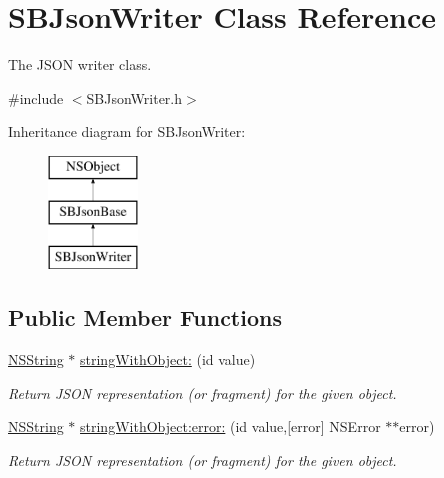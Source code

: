 \hypertarget{interface_s_b_json_writer}{
\section{\-S\-B\-Json\-Writer \-Class \-Reference}
\label{interface_s_b_json_writer}
}


\-The \-J\-S\-O\-N writer class.  




{\ttfamily \#include $<$\-S\-B\-Json\-Writer.\-h$>$}

\-Inheritance diagram for \-S\-B\-Json\-Writer\-:\begin{figure}[H]
\begin{center}
\leavevmode
\includegraphics[height=3.000000cm]{interface_s_b_json_writer}
\end{center}
\end{figure}
\subsection*{\-Public \-Member \-Functions}
\begin{DoxyCompactItemize}
\item 
\hyperlink{class_n_s_string}{\-N\-S\-String} $\ast$ \hyperlink{interface_s_b_json_writer_a9018ceff9753092b310a43782c5083ed}{string\-With\-Object\-:} (id value)
\begin{DoxyCompactList}\small\item\em \-Return \-J\-S\-O\-N representation (or fragment) for the given object. \end{DoxyCompactList}\item 
\hyperlink{class_n_s_string}{\-N\-S\-String} $\ast$ \hyperlink{interface_s_b_json_writer_a41cfe2a66c774790785a841633cc0bc4}{string\-With\-Object\-:error\-:} (id value,\mbox{[}error\mbox{]} \-N\-S\-Error $\ast$$\ast$error)
\begin{DoxyCompactList}\small\item\em \-Return \-J\-S\-O\-N representation (or fragment) for the given object. \end{DoxyCompactList}\end{DoxyCompactItemize}
